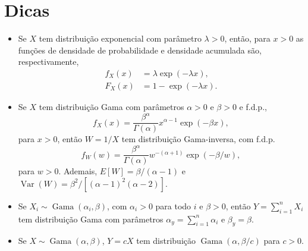 \documentclass[a4paper,10pt, notitlepage]{report}
\newcommand{\vr}{\operatorname{Var}} %
\newcommand{\rs}{X_1, X_2, \ldots, X_n} %
\begin{document}
\section*{Dicas}
\begin{itemize}
 \item Se $X$ tem distribuição exponencial com parâmetro $\lambda > 0$, então, para $x>0$ as funções de densidade de probabilidade e densidade acumulada são, respectivamente,
 \begin{align*}
 f_X(x) &= \lambda \exp\left(-\lambda x\right),\\
 F_X(x) &= 1 - \exp(-\lambda x).
 \end{align*}
 \item Se $X$ tem distribuição Gama com parâmetros $\alpha >0$ e $\beta >0$ e f.d.p.,
 $$
 f_X(x) = \frac{\beta^\alpha}{\Gamma(\alpha)} x^{\alpha - 1} \exp(-\beta x),
 $$
 para $x>0$, então $W = 1/X$ tem distribuição Gama-inversa, com f.d.p.
 $$
 f_W(w) = \frac{\beta^\alpha}{\Gamma(\alpha)} w^{-(\alpha + 1)} \exp(-\beta/w),
 $$
 para $w>0$.
 Ademais, $E[W] = \beta/(\alpha - 1)$ e $\vr(W) = \beta^2/[(\alpha-1)^2(\alpha-2)]$.
\item Se $X_i \sim \operatorname{Gama}(\alpha_i, \beta)$, com $\alpha_i >0$  para todo $i$ e $\beta>0$, então $Y = \sum_{i=1}^n X_i$ tem distribuição Gama com parâmetros $\alpha_y = \sum_{i=1}^n \alpha_i$ e $\beta_y = \beta$.
\item Se $X \sim \operatorname{Gama}(\alpha, \beta)$, $Y = cX$ tem distribuição $\operatorname{Gama}(\alpha, \beta/c)$ para $c>0$.
 \end{itemize}
 
\end{document}
